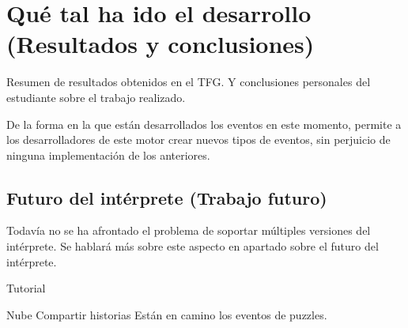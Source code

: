 \chapter{Qué tal ha ido el desarrollo (Resultados y conclusiones)}
Resumen de resultados obtenidos en el TFG. Y conclusiones personales del estudiante sobre el trabajo realizado.

De la forma en la que están desarrollados los eventos en este momento, permite a los desarrolladores de este motor crear nuevos tipos de eventos, sin perjuicio de ninguna implementación de los anteriores.

\section{Futuro del intérprete (Trabajo futuro)}
 Todavía no se ha afrontado el problema de soportar múltiples versiones del intérprete. Se hablará más sobre este aspecto en apartado sobre el futuro del intérprete.
 
 Tutorial
 
 Nube
 Compartir historias
 Están en camino los eventos de puzzles.


